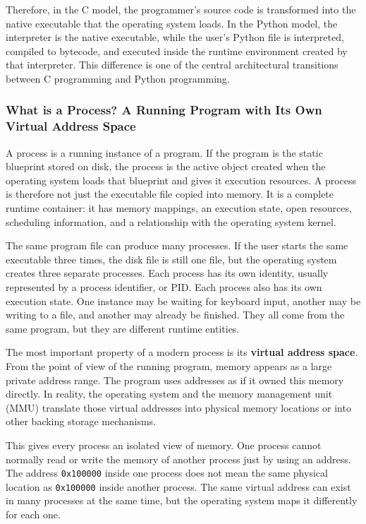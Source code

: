 \documentclass[a4paper,twoside]{report}
\begin{document}
Therefore, in the C model, the programmer's source code is transformed into the native executable that the operating system loads. In the Python model, the interpreter is the native executable, while the user's Python file is interpreted, compiled to bytecode, and executed inside the runtime environment created by that interpreter. This difference is one of the central architectural transitions between C programming and Python programming.

\subsubsection{What is a Process? A Running Program with Its Own Virtual Address Space}

A process is a running instance of a program. If the program is the static blueprint stored on disk, the process is the active object created when the operating system loads that blueprint and gives it execution resources. A process is therefore not just the executable file copied into memory. It is a complete runtime container: it has memory mappings, an execution state, open resources, scheduling information, and a relationship with the operating system kernel.

The same program file can produce many processes. If the user starts the same executable three times, the disk file is still one file, but the operating system creates three separate processes. Each process has its own identity, usually represented by a process identifier, or PID. Each process also has its own execution state. One instance may be waiting for keyboard input, another may be writing to a file, and another may already be finished. They all come from the same program, but they are different runtime entities.

The most important property of a modern process is its \textbf{virtual address space}. From the point of view of the running program, memory appears as a large private address range. The program uses addresses as if it owned this memory directly. In reality, the operating system and the memory management unit (MMU) translate those virtual addresses into physical memory locations or into other backing storage mechanisms.

This gives every process an isolated view of memory. One process cannot normally read or write the memory of another process just by using an address. The address \texttt{0x100000} inside one process does not mean the same physical location as \texttt{0x100000} inside another process. The same virtual address can exist in many processes at the same time, but the operating system maps it differently for each one.
\end{document}
